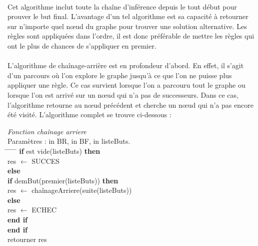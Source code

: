 \documentclass {report}
\begin{document}
\paragraph{}
Cet algorithme inclut toute la chaîne d'inférence depuis le tout début pour prouver le but final. L'avantage d'un tel algorithme est sa capacité à retourner sur n'importe quel nœud du graphe pour trouver une solution alternative. Les règles sont appliquées dans l'ordre, il est donc préférable de mettre les règles qui ont le plus de chances de s'appliquer en premier.

\paragraph{}
L'algorithme de chaînage-arrière est en profondeur d'abord. En effet, il s'agit d'un parcours où l'on explore le graphe jusqu'à ce que l'on ne puisse plus appliquer une règle. Ce cas survient lorsque l'on a parcouru tout le graphe ou lorsque l'on est arrivé sur un nœud qui n'a pas de successeurs. Dans ce cas, l'algorithme retourne au nœud précédent et cherche un nœud qui n'a pas encore été visité. L'algorithme complet se trouve ci-dessous :
\begin{tabbing}
\textit{Fonction chaînage arriere}\\
Paramètres : in BR, in BF, in listeButs.\\
\hspace{0.5cm} \= \hspace{0.5cm} \= \hspace{0.5cm} \= \hspace{0.5cm} \= \hspace{0.5cm} \= \kill
\> \textbf{if} est vide(listeButs) \textbf{then}\\
\> \> res $\leftarrow$ SUCCES\\
\> \textbf{else}\\
\> \> \textbf{if} demBut(premier(listeButs)) \textbf{then}\\
\> \> \> res $\leftarrow$ chaînageArriere(suite(listeButs))\\
\> \> \textbf{else}\\
\> \> \> res $\leftarrow$ ECHEC\\
\> \> \textbf{end if}\\
\> \textbf{end if}\\
retourner res\\
\end{tabbing}
\end{document}
